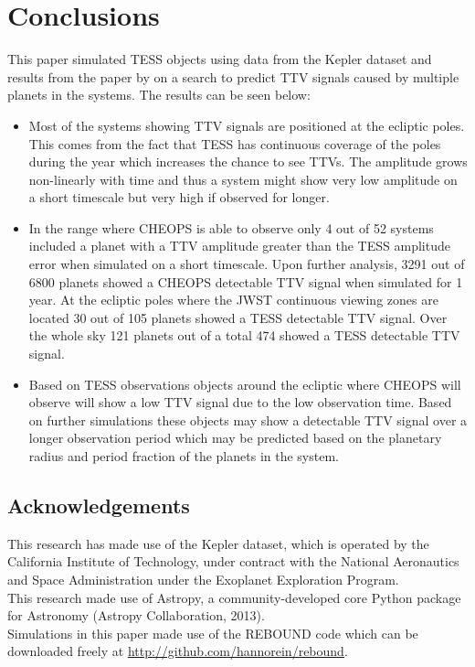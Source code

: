 \documentclass[12pt]{report}
\begin{document}
\chapter{Conclusions}
	This paper simulated TESS objects using data from the Kepler dataset and results from the paper by \cite{2015ApJ...809...77S} on a search to predict TTV signals caused by multiple planets in the systems. The results can be seen below:
	\begin{itemize}
		\item Most of the systems showing TTV signals are positioned at the ecliptic poles. This comes from the fact that TESS has continuous coverage of the poles during the year which increases the chance to see TTVs. The amplitude grows non-linearly with time and thus a system might show very low amplitude on a short timescale but very high if observed for longer.
		\item In the range where CHEOPS is able to observe only 4 out of 52 systems included a planet with a TTV amplitude greater than the TESS amplitude error when simulated on a short timescale. Upon further analysis, 3291 out of 6800 planets showed a CHEOPS detectable TTV signal when simulated for 1 year. At the ecliptic poles where the JWST continuous viewing zones are located 30 out of 105 planets showed a TESS detectable TTV signal. Over the whole sky 121 planets out of a total 474 showed a TESS detectable TTV signal.
		\item Based on TESS observations objects around the ecliptic where CHEOPS will observe will show a low TTV signal due to the low observation time. Based on further simulations these objects may show a detectable TTV signal over a longer observation period which may be predicted based on the planetary radius and period fraction of the planets in the system.
	\end{itemize}

\section*{Acknowledgements}
This research has made use of the Kepler dataset, which is operated by the California Institute of Technology, under contract with the National Aeronautics and Space Administration under the Exoplanet Exploration Program. \vspace{0.5cm}\\
This research made use of Astropy, a community-developed core Python package for Astronomy (Astropy Collaboration, 2013).\vspace{0.5cm}\\
Simulations in this paper made use of the REBOUND code which can be downloaded freely at \url{http://github.com/hannorein/rebound}.
\end{document}
